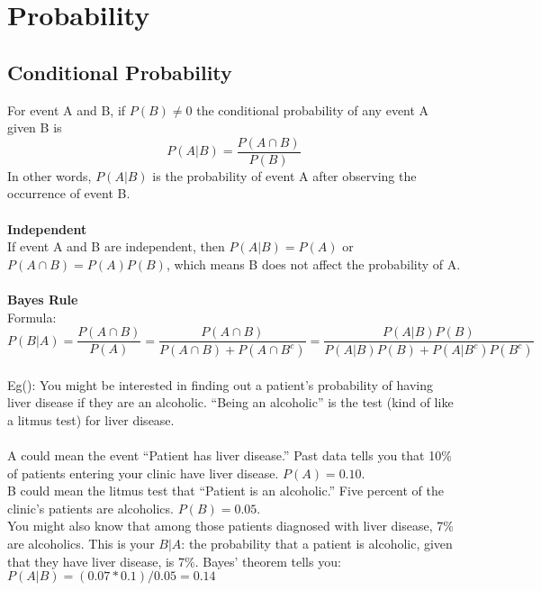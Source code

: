 \documentclass[a4paper,12pt]{article}
\let\cite\parencite
\begin{document}
\section{Probability} 
\subsection{Conditional Probability}
For event A and B, if $P(B) \neq 0$ the conditional probability of any event A given B is
$$P(A|B) = \frac{P(A \cap B)}{P(B)}$$
In other words, $P(A|B)$ is the probability of event A after observing the occurrence of event B. \\
\\
\textbf{Independent} \\
If event A and B are independent, then $P(A|B) = P(A)$ or $P(A \cap B) = P(A)P(B)$, which means B does not affect the probability of A.\\
\\
\textbf{Bayes Rule}\\
Formula: $$P(B|A) = \frac{P(A \cap B)}{P(A)} = \frac{P(A \cap B)}{P(A \cap B) + P(A \cap B^c)} = \frac{P(A|B)P(B)}{P(A|B)P(B) + P(A|B^c)P(B^c)}$$
\\
Eg(\cite{baye}): You might be interested in finding out a patient’s probability of having liver disease if they are an alcoholic. “Being an alcoholic” is the test (kind of like a litmus test) for liver disease.\\
\\
A could mean the event “Patient has liver disease.” Past data tells you that 10\% of patients entering your clinic have liver disease. $P(A) = 0.10$. \\
B could mean the litmus test that “Patient is an alcoholic.” Five percent of the clinic’s patients are alcoholics. $P(B) = 0.05$.\\
You might also know that among those patients diagnosed with liver disease, 7\% are alcoholics. This is your $B|A$: the probability that a patient is alcoholic, given that they have liver disease, is 7\%.
Bayes’ theorem tells you:
$P(A|B) = (0.07 * 0.1)/0.05 = 0.14$
\end{document}
